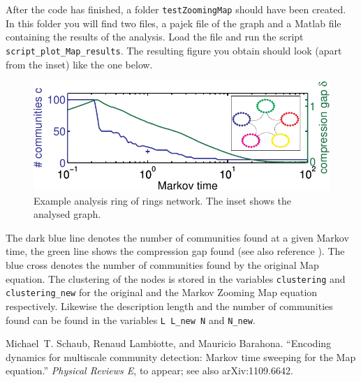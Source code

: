 \documentclass[a4paper,10pt]{scrartcl}
\begin{document}
After the code has finished, a folder \texttt{testZoomingMap} should have been created. In this folder you will find two files, a pajek file of the graph and a Matlab file containing the results of the analysis. Load the file and run the script \texttt{script\_plot\_Map\_results}. The resulting figure you obtain should look (apart from the inset) like the one below.
\begin{figure}[tb!]
 \centering
 \includegraphics{./test.pdf}
 \caption{Example analysis ring of rings network. The inset shows the analysed graph.}
 \label{fig:1}
\end{figure}
The dark blue line denotes the number of communities found at a given Markov time, the green line shows the compression gap found (see also reference \cite{Schaub2012} ).
The blue cross denotes the number of communities found by the original Map equation.
The clustering of the nodes is stored in the variables \texttt{clustering} and \texttt{clustering\_new} for the original and the Markov Zooming Map equation respectively.
Likewise the description length and the number of communities found can be found in the variables \texttt{L L\_new N} and \texttt{N\_new}.

\begin{thebibliography}{1}
Michael~T. Schaub, Renaud Lambiotte, and Mauricio Barahona.
\newblock ``{E}ncoding dynamics for multiscale community detection: {M}arkov time sweeping for the {M}ap equation.''
\newblock \textit{Physical Reviews E}, to appear; see also arXiv:1109.6642.
\end{thebibliography}
\end{document}
